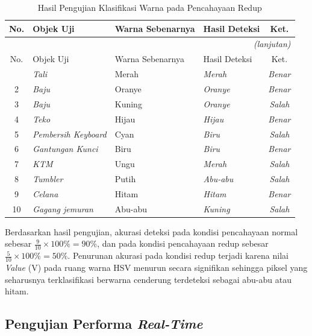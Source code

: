 \begin{longtable}{|c|>{\raggedright\arraybackslash}p{3cm}|>{\raggedright\arraybackslash}p{2.8cm}|>{\raggedright\arraybackslash}p{2.8cm}|c|}
  \caption{Hasil Pengujian Klasifikasi Warna pada Pencahayaan Redup}
  \label{tab:akurasi-redup} \\
  \hline
  No. & Objek Uji & Warna Sebenarnya & Hasil Deteksi & Ket. \\
  \hline
  \endfirsthead
  \multicolumn{5}{r}{\textit{(lanjutan)}} \\
  \hline
  No. & Objek Uji & Warna Sebenarnya & Hasil Deteksi & Ket. \\
  \hline
  \endhead
  \hline
  \endfoot
  1  & \textit{Tali} & Merah   & \textit{Merah} & \textit{Benar} \\ \hline
  2  & \textit{Baju} & Oranye   & \textit{Oranye} & \textit{Benar} \\ \hline
  3  & \textit{Baju} & Kuning  & \textit{Oranye} & \textit{Salah} \\ \hline
  4  & \textit{Teko} & Hijau   & \textit{Hijau} & \textit{Benar} \\ \hline
  5  & \textit{Pembersih Keyboard} & Cyan    & \textit{Biru} & \textit{Salah} \\ \hline
  6  & \textit{Gantungan Kunci} & Biru    & \textit{Biru} & \textit{Benar} \\ \hline
  7  & \textit{KTM} & Ungu    & \textit{Merah} & \textit{Salah} \\ \hline
  8  & \textit{Tumbler} & Putih   & \textit{Abu-abu} & \textit{Salah} \\ \hline
  9  & \textit{Celana} & Hitam   & \textit{Hitam} & \textit{Benar} \\ \hline
  10 & \textit{Gagang jemuran} & Abu-abu & \textit{Kuning} & \textit{Salah} \\ \hline
\end{longtable}

Berdasarkan hasil pengujian, akurasi deteksi pada kondisi pencahayaan normal sebesar
$\frac{9}{10} \times 100\% = 90\%$,
dan pada kondisi pencahayaan redup sebesar
$\frac{5}{10} \times 100\% = 50\%$.
Penurunan akurasi pada kondisi redup terjadi karena nilai \textit{Value} (V) pada ruang warna HSV menurun secara signifikan sehingga piksel yang seharusnya terklasifikasi berwarna cenderung terdeteksi sebagai abu-abu atau hitam.

\subsection{Pengujian Performa \textit{Real-Time}}

